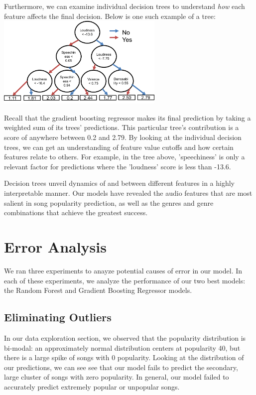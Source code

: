 \documentclass[journal]{IEEEtran}
\begin{document}
Furthermore, we can examine individual decision trees to understand \textit{how} each feature affects the final decision. Below is one such example of a tree: \\

\includegraphics[width=8cm]{images/gbm_example_tree.png}

\quad\newline
Recall that the gradient boosting regressor makes its final prediction by taking a weighted sum of its trees' predictions. This particular tree's contribution is a score of anywhere between 0.2 and 2.79. By looking at the individual decision trees, we can get an understanding of feature value cutoffs and how certain features relate to others. For example, in the tree above, 'speechiness' is only a relevant factor for predictions where the 'loudness' score is less than -13.6.

Decision trees unveil dynamics of and between different features in a highly interpretable manner. Our models have revealed the audio features that are most salient in song popularity prediction, as well as the genres and genre combinations that achieve the greatest success.

\section{Error Analysis}

We ran three experiments to anayze potential causes of error in our model. In each of these experiments, we analyze the performance of our two best models: the Random Forest and Gradient Boosting Regressor models.

\subsection{Eliminating Outliers}
In our data exploration section, we observed that the popularity distribution is bi-modal: an approximately normal distribution centers at popularity 40, but there is a large spike of songs with 0 popularity. Looking at the distribution of our predictions, we can see see that our model fails to predict the secondary, large cluster of songs with zero popularity. In general, our model failed to accurately predict extremely popular or unpopular songs.
\end{document}
